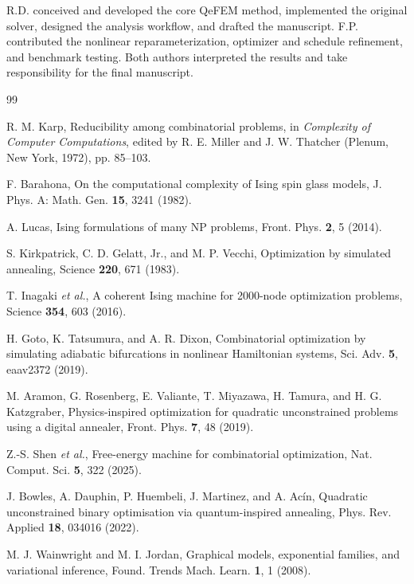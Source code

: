 \documentclass[
  aps,
  prx,
  reprint,
  amsmath,
  amssymb,
  groupedaddress,
  nofootinbib,
  floatfix,
  longbibliography
]{revtex4-2}
\newcommand{\qefem}{QeFEM}
\begin{document}
R.D. conceived and developed the core \qefem{} method, implemented the
original solver, designed the analysis workflow, and drafted the manuscript.
F.P. contributed the nonlinear reparameterization, optimizer and schedule
refinement, and benchmark testing.  Both authors interpreted the results and
take responsibility for the final manuscript.

\begin{thebibliography}{99}

R. M. Karp, Reducibility among combinatorial problems, in
\emph{Complexity of Computer Computations}, edited by R. E. Miller and
J. W. Thatcher (Plenum, New York, 1972), pp. 85--103.

F. Barahona, On the computational complexity of Ising spin glass models,
J. Phys. A: Math. Gen. \textbf{15}, 3241 (1982).

A. Lucas, Ising formulations of many NP problems, Front. Phys. \textbf{2}, 5
(2014).

S. Kirkpatrick, C. D. Gelatt, Jr., and M. P. Vecchi, Optimization by simulated
annealing, Science \textbf{220}, 671 (1983).

T. Inagaki \emph{et al.}, A coherent Ising machine for 2000-node optimization
problems, Science \textbf{354}, 603 (2016).

H. Goto, K. Tatsumura, and A. R. Dixon, Combinatorial optimization by
simulating adiabatic bifurcations in nonlinear Hamiltonian systems, Sci. Adv.
\textbf{5}, eaav2372 (2019).

M. Aramon, G. Rosenberg, E. Valiante, T. Miyazawa, H. Tamura, and
H. G. Katzgraber, Physics-inspired optimization for quadratic unconstrained
problems using a digital annealer, Front. Phys. \textbf{7}, 48 (2019).

Z.-S. Shen \emph{et al.}, Free-energy machine for combinatorial optimization,
Nat. Comput. Sci. \textbf{5}, 322 (2025).

J. Bowles, A. Dauphin, P. Huembeli, J. Martinez, and A. Ac\'in, Quadratic
unconstrained binary optimisation via quantum-inspired annealing, Phys. Rev.
Applied \textbf{18}, 034016 (2022).

M. J. Wainwright and M. I. Jordan, Graphical models, exponential families,
and variational inference, Found. Trends Mach. Learn. \textbf{1}, 1 (2008).


\end{thebibliography}
\end{document}
